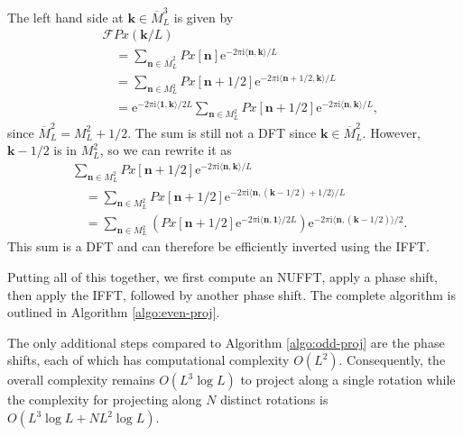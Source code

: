 \documentclass{article}
\newcommand{\euler}{\mathrm{e}}
\newcommand{\imunit}{\mathrm{i}}
\newcommand{\meshu}{M}
\newcommand{\meshc}{\overline{M}}
\newcommand{\vol}{x}
\newcommand{\proj}{P}
\newcommand{\vn}{\boldsymbol{n}}
\newcommand{\vk}{\boldsymbol{k}}
\newcommand{\vones}{\boldsymbol{1}}
\newcommand{\fourier}[1]{\mathcal{F}#1}
\begin{document}
The left hand side at $\vk \in \meshc_L^3$ is given by
\begin{align}
    &\fourier{\proj \vol}(\vk/L) \\
    &\quad = \sum_{\vn \in \meshc_L^2} \proj\vol[\vn] \euler^{-2\pi\imunit \langle \vn, \vk \rangle/L} \\
    &\quad = \sum_{\vn \in \meshu_L^2} \proj\vol[\vn+1/2] \euler^{-2\pi\imunit \langle \vn+1/2, \vk \rangle/L} \\
    &\quad = \euler^{-2\pi\imunit \langle \vones, \vk \rangle/2L} \sum_{\vn \in \meshu_L^2} \proj\vol[\vn+1/2] \euler^{-2\pi\imunit \langle \vn, \vk \rangle/L}\mbox{,}
\end{align}
since $\meshc_L^2 = \meshu_L^2 + 1/2$.
The sum is still not a DFT since $\vk \in \meshc_L^2$.
However, $\vk-1/2$ is in $\meshu_L^2$, so we can rewrite it as
\begin{align}
    &\sum_{\vn \in \meshu_L^2} \proj\vol[\vn+1/2] \euler^{-2\pi\imunit \langle \vn, \vk \rangle/L} \\
    &\quad = \sum_{\vn \in \meshu_L^2} \proj\vol[\vn+1/2] \euler^{-2\pi\imunit \langle \vn, (\vk-1/2)+1/2 \rangle/L} \\
    &\quad = \sum_{\vn \in \meshu_L^2} \left(\proj\vol[\vn+1/2] \euler^{-2\pi\imunit \langle \vn, \vones \rangle/2L}\right) \euler^{-2\pi\imunit \langle \vn, (\vk-1/2)\rangle/2} \mbox{.}
\end{align}
This sum is a DFT and can therefore be efficiently inverted using the IFFT.

Putting all of this together, we first compute an NUFFT, apply a phase shift, then apply the IFFT, followed by another phase shift.
The complete algorithm is outlined in Algorithm \ref{algo:even-proj}.

The only additional steps compared to Algorithm \ref{algo:odd-proj} are the phase shifts, each of which has computational complexity $O(L^2)$.
Consequently, the overall complexity remains $O(L^3 \log L)$ to project along a single rotation while the complexity for projecting along $N$ distinct rotations is $O(L^3 \log L + N L^2 \log L)$.
\end{document}
